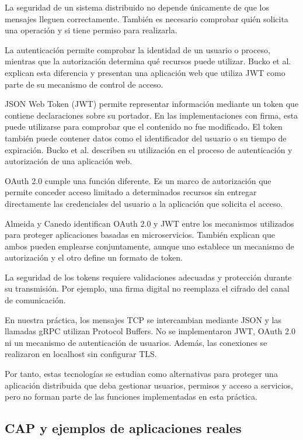 La seguridad de un sistema distribuido
no depende únicamente de que los mensajes
lleguen correctamente. También es necesario
comprobar quién solicita una operación
y si tiene permiso para realizarla.

La autenticación permite comprobar la
identidad de un usuario o proceso,
mientras que la autorización determina
qué recursos puede utilizar. Bucko et al.
\cite{bucko2023jwt} explican esta
diferencia y presentan una aplicación
web que utiliza JWT como parte de su
mecanismo de control de acceso.

JSON Web Token (JWT) permite representar
información mediante un token que contiene
declaraciones sobre su portador. En las
implementaciones con firma, esta puede
utilizarse para comprobar que el contenido
no fue modificado. El token también puede
contener datos como el identificador del
usuario o su tiempo de expiración.
Bucko et al. \cite{bucko2023jwt}
describen su utilización en el proceso
de autenticación y autorización de
una aplicación web.

OAuth 2.0 cumple una función diferente.
Es un marco de autorización que permite
conceder acceso limitado a determinados
recursos sin entregar directamente las
credenciales del usuario a la aplicación
que solicita el acceso.

Almeida y Canedo
\cite{almeida2022authmicroservices}
identifican OAuth 2.0 y JWT entre los
mecanismos utilizados para proteger
aplicaciones basadas en microservicios.
También explican que ambos pueden
emplearse conjuntamente, aunque uno
establece un mecanismo de autorización
y el otro define un formato de token.

La seguridad de los tokens requiere
validaciones adecuadas y protección
durante su transmisión. Por ejemplo,
una firma digital no reemplaza el
cifrado del canal de comunicación.

En nuestra práctica, los mensajes TCP
se intercambian mediante JSON y las
llamadas gRPC utilizan Protocol Buffers.
No se implementaron JWT, OAuth 2.0
ni un mecanismo de autenticación de
usuarios. Además, las conexiones se
realizaron en localhost sin configurar
TLS.

Por tanto, estas tecnologías se estudian
como alternativas para proteger una
aplicación distribuida que deba gestionar
usuarios, permisos y acceso a servicios,
pero no forman parte de las funciones
implementadas en esta práctica.

\subsection{CAP y ejemplos de aplicaciones reales}

